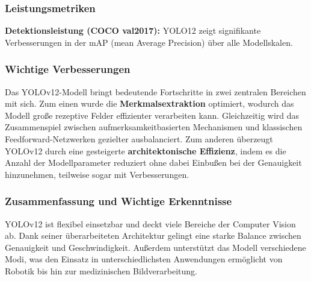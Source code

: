 \subsubsection{Leistungsmetriken}
\textbf{Detektionsleistung (COCO val2017):} YOLO12 zeigt signifikante Verbesserungen in der mAP (mean Average Precision) über alle Modellskalen.\\
\begin{table}[!htbp]
    \centering
    \caption{Vergleich verschiedener YOLOv12-Modelle}
    \end{table}

    \subsubsection{Wichtige Verbesserungen}
Das YOLOv12-Modell bringt bedeutende Fortschritte in zwei zentralen Bereichen mit sich. Zum einen wurde die \textbf{Merkmalsextraktion} optimiert, wodurch das Modell große rezeptive Felder effizienter verarbeiten kann. Gleichzeitig wird das Zusammenspiel zwischen aufmerksamkeitbasierten Mechanismen und klassischen Feedforward-Netzwerken gezielter ausbalanciert. Zum anderen überzeugt YOLOv12 durch eine gesteigerte \textbf{architektonische Effizienz}, indem es die Anzahl der Modellparameter reduziert ohne dabei Einbußen bei der Genauigkeit hinzunehmen, teilweise sogar mit Verbesserungen.

\subsubsection{Zusammenfassung und Wichtige Erkenntnisse}
YOLOv12 ist flexibel einsetzbar und deckt viele Bereiche der Computer Vision ab. Dank seiner überarbeiteten Architektur gelingt eine starke Balance zwischen Genauigkeit und Geschwindigkeit. Außerdem unterstützt das Modell verschiedene Modi, was den Einsatz in unterschiedlichsten Anwendungen ermöglicht von Robotik bis hin zur medizinischen Bildverarbeitung.

